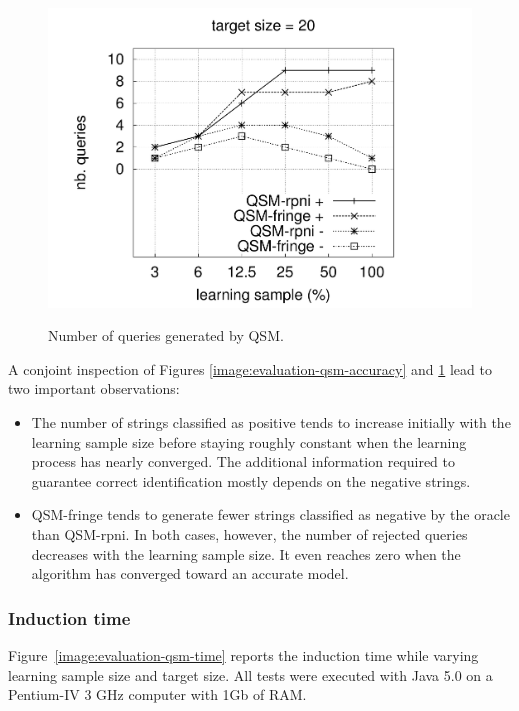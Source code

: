 \begin{figure}
{  \includegraphics[trim=30mm 0mm 35mm 0mm, clip, page=4]{src/5-evaluation/images/queries}
}
\caption{Number of queries generated by QSM\label{image:evaluation-qsm-number-of-questions}.}
\end{figure}

A conjoint inspection of Figures \ref{image:evaluation-qsm-accuracy} and \ref{image:evaluation-qsm-number-of-questions} lead to two important observations:
\begin{itemize}
\item The number of strings classified as positive tends to increase initially with the learning sample size before staying roughly constant when the learning process has nearly converged. The additional information required to guarantee correct identification mostly depends on the negative strings.
\item QSM-fringe tends to generate fewer strings classified as negative by the oracle than QSM-rpni. In both cases, however, the number of rejected queries decreases with the learning sample size. It even reaches zero when the algorithm has converged toward an accurate model.
\end{itemize}

\subsubsection*{Induction time\label{cpu:time}}

Figure~\ref{image:evaluation-qsm-time} reports the induction time while varying learning sample size and target size. All tests were executed with Java 5.0 on a Pentium-IV 3 GHz computer with 1Gb of RAM. 

